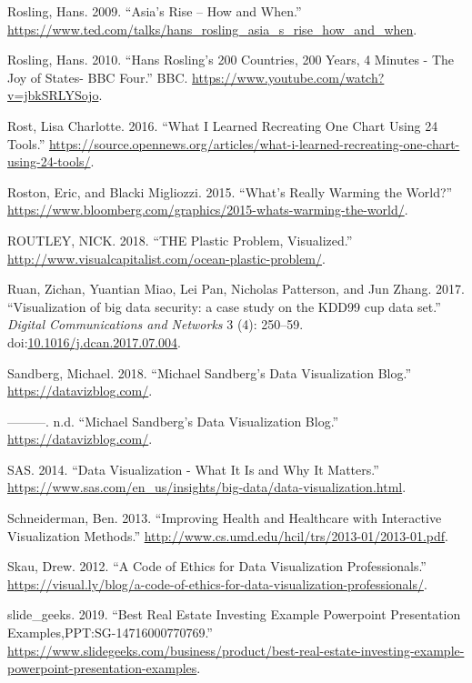 \documentclass[]{book}
\begin{document}
\hypertarget{ref-hans}{}
Rosling, Hans. 2009. ``Asia's Rise -- How and When.''
\url{https://www.ted.com/talks/hans_rosling_asia_s_rise_how_and_when}.

\hypertarget{ref-hans_rosling}{}
Rosling, Hans. 2010. ``Hans Rosling's 200 Countries, 200 Years, 4
Minutes - The Joy of States- BBC Four.'' BBC.
\url{https://www.youtube.com/watch?v=jbkSRLYSojo}.

\hypertarget{ref-different_tools}{}
Rost, Lisa Charlotte. 2016. ``What I Learned Recreating One Chart Using
24 Tools.''
\url{https://source.opennews.org/articles/what-i-learned-recreating-one-chart-using-24-tools/}.

\hypertarget{ref-world_warming}{}
Roston, Eric, and Blacki Migliozzi. 2015. ``What's Really Warming the
World?''
\url{https://www.bloomberg.com/graphics/2015-whats-warming-the-world/}.

\hypertarget{ref-plastic_pollution_infographics}{}
ROUTLEY, NICK. 2018. ``THE Plastic Problem, Visualized.''
\url{http://www.visualcapitalist.com/ocean-plastic-problem/}.

\hypertarget{ref-gapminder}{}
Ruan, Zichan, Yuantian Miao, Lei Pan, Nicholas Patterson, and Jun Zhang.
2017. ``Visualization of big data security: a case study on the KDD99
cup data set.'' \emph{Digital Communications and Networks} 3 (4):
250--59.
doi:\href{https://doi.org/10.1016/j.dcan.2017.07.004}{10.1016/j.dcan.2017.07.004}.

\hypertarget{ref-sandberg_blog}{}
Sandberg, Michael. 2018. ``Michael Sandberg's Data Visualization Blog.''
\url{https://datavizblog.com/}.

\hypertarget{ref-Michael_Sandberg_blog}{}
---------. n.d. ``Michael Sandberg's Data Visualization Blog.''
\url{https://datavizblog.com/}.

\hypertarget{ref-why_dataviz_matters}{}
SAS. 2014. ``Data Visualization - What It Is and Why It Matters.''
\url{https://www.sas.com/en_us/insights/big-data/data-visualization.html}.

\hypertarget{ref-data_viz_healthcare}{}
Schneiderman, Ben. 2013. ``Improving Health and Healthcare with
Interactive Visualization Methods.''
\url{http://www.cs.umd.edu/hcil/trs/2013-01/2013-01.pdf}.

\hypertarget{ref-ethics_code}{}
Skau, Drew. 2012. ``A Code of Ethics for Data Visualization
Professionals.''
\url{https://visual.ly/blog/a-code-of-ethics-for-data-visualization-professionals/}.

\hypertarget{ref-slide_geeks}{}
slide\_geeks. 2019. ``Best Real Estate Investing Example Powerpoint
Presentation Examples,PPT:SG-14716000770769.''
\url{https://www.slidegeeks.com/business/product/best-real-estate-investing-example-powerpoint-presentation-examples}.
\end{document}
